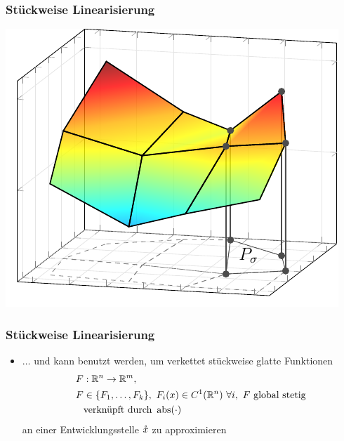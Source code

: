 \begin{frame}[<+->]
\frametitle{Stückweise Linearisierung}
\centering
\includegraphics[width=0.65\linewidth]{../dipl_tex/img/tikz/polyhedral_subdevision.pdf}
\end{frame}

\begin{frame}[<+->]
\frametitle{Stückweise Linearisierung}
\begin{itemize}
 \item $\ldots$ und kann benutzt werden, um verkettet stückweise glatte Funktionen 
 \[
 \begin{aligned}
   F&:\R^n \to \R^m, \\
 F&\in \lbrace F_1,\ldots,F_k\rbrace,~F_i(x) \in C^1(\R^n)~\forall i,~F \text{ global stetig}\\
 &\text{verknüpft durch }\abs(\cdot) %
 \end{aligned}
 \]
an einer Entwicklungsstelle $\mathring{x}$ zu approximieren
\end{itemize}
\end{frame}

